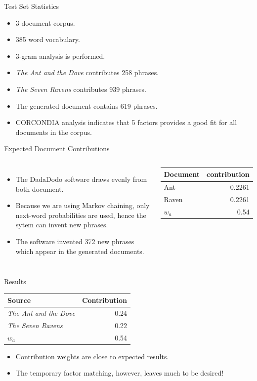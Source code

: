 \documentclass[handout]{beamer}
\begin{document}
\begin{frame}{Test Set Statistics}
    \begin{itemize}[<+->]
        \item 3 document corpus.
        \item 385 word vocabulary.
        \item 3-gram analysis is performed.
        \item {\em The Ant and the Dove} contributes 258 phrases.
        \item {\em The Seven Ravens} contributes 939 phrases.
        \item The generated document contains 619 phrases.
        \item CORCONDIA analysis indicates that 5 factors provides a good fit for all documents in the corpus.
    \end{itemize}
\end{frame}

\begin{frame}{Expected Document Contributions}
    \begin{columns}
        \begin{itemize}[<+->]
            \item The DadaDodo software draws evenly from both document.
            \item Because we are using Markov chaining, only next-word probabilities are used, hence the sytem can invent new phrases.
            \item The software invented 372 new phrases which appear in the generated documents.
        \end{itemize}
        \begin{tabular}{l|r}
        {\bf Document} & {\bf contribution} \\
        \hline
        Ant &  0.2261 \\
        Raven & 0.2261 \\
        $w_a$ & 0.54 \\
        \end{tabular}
    \end{columns}
\end{frame}

\begin{frame}{Results}
    \begin{tabular}{l|r}
        {\bf Source} & {\bf Contribution} \\
        \hline
        {\em The Ant and the Dove} & 0.24 \\
        {\em The Seven Ravens} & 0.22 \\
        $w_a$ & 0.54
    \end{tabular}
    \begin{itemize}[<+->]
        \item Contribution weights are close to expected results.
        \item The temporary factor matching, however, leaves much to be desired!
    \end{itemize}
\end{frame}
\end{document}

